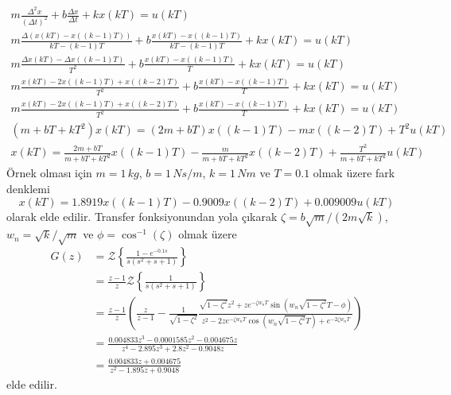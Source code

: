 \begin{gather}
    m\frac{\Delta^2 x}{(\Delta t)^2}+b\frac{\Delta x}{\Delta t}+kx(kT)=u(kT)\nonumber\\
    m\frac{\Delta (x(kT)-x((k-1)T))}{kT-(k-1)T}+b\frac{x(kT)-x((k-1)T)}{kT-(k-1)T}+kx(kT)=u(kT)\nonumber\\
    m\frac{\Delta x(kT)-\Delta x((k-1)T)}{T^2}+b\frac{x(kT)-x((k-1)T)}{T}+kx(kT)=u(kT)\nonumber\\
    m\frac{x(kT)-2x((k-1)T)+x((k-2)T)}{T^2}+b\frac{x(kT)-x((k-1)T)}{T}+kx(kT)=u(kT)\nonumber\\
    m\frac{x(kT)-2x((k-1)T)+x((k-2)T)}{T^2}+b\frac{x(kT)-x((k-1)T)}{T}+kx(kT)=u(kT)\nonumber\\
    (m+bT+kT^2)x(kT)=(2m+bT)x((k-1)T)-mx((k-2)T)+T^2u(kT)\nonumber\\
    x(kT)=\frac{2m+bT}{m+bT+kT^2}x((k-1)T)-\frac{m}{m+bT+kT^2}x((k-2)T)+\frac{T^2}{m+bT+kT^2}u(kT)
\end{gather}
Örnek olması için $m=1\,kg$, $b=1\,Ns/m$, $k=1\,Nm$ ve $T=0.1$ olmak üzere fark denklemi
\begin{equation}
    x(kT)=1.8919x((k-1)T)-0.9009x((k-2)T)+0.009009u(kT)
\end{equation}
olarak elde edilir. Transfer fonksiyonundan yola çıkarak $\zeta=b\sqrt{m}/(2m\sqrt{k})$, $w_n=\sqrt{k}/\sqrt{m}$ ve $\phi=\cos^{-1}(\zeta)$ olmak üzere
\begin{equation}
\begin{split}
    G(z)&=\mathcal{Z}\left\{\frac{1-e^{-0.1s}}{s(s^2+s+1)}\right\}\\
    &=\frac{z-1}{z}\mathcal{Z}\left\{\frac{1}{s(s^2+s+1)}\right\}\\
    &=\frac{z-1}{z}\left(\frac{z}{z-1}-\frac{1}{\sqrt{1-\zeta^2}}\frac{\sqrt{1-\zeta^2}z^2+ze^{-\zeta w_nT}\sin(w_n\sqrt{1-\zeta^2}T-\phi)}{z^2-2ze^{-\zeta w_nT}\cos(w_n\sqrt{1-\zeta^2}T)+e^{-2\zeta w_nT}}\right)\\
    &=\frac{0.004833 z^3 - 0.0001585 z^2 - 0.004675 z}{ z^4 - 2.895 z^3 + 2.8 z^2 - 0.9048 z}\\
    &=\frac{0.004833 z + 0.004675}{z^2 - 1.895 z + 0.9048}
\end{split}
\end{equation}
elde edilir.
